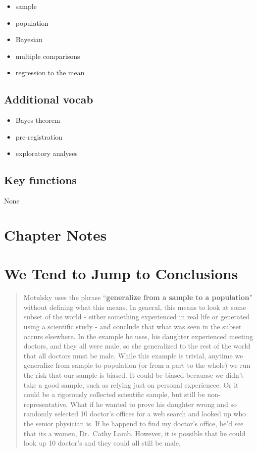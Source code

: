 \documentclass[]{book}
\providecommand{\tightlist}{%
  \setlength{\itemsep}{0pt}\setlength{\parskip}{0pt}}
\theoremstyle{definition}
\theoremstyle{definition}
\theoremstyle{definition}
\theoremstyle{remark}
\begin{document}
\begin{itemize}
\tightlist
\item
  sample
\item
  population
\item
  Bayesian
\item
  multiple comparisons
\item
  regression to the mean
\end{itemize}

\subsection*{Additional vocab}\label{additional-vocab}

\begin{itemize}
\tightlist
\item
  Bayes theorem
\item
  pre-registration
\item
  exploratory analyses
\end{itemize}

\subsection*{Key functions}\label{key-functions}

None

\section*{Chapter Notes}\label{chapter-notes}

\section{We Tend to Jump to
Conclusions}\label{we-tend-to-jump-to-conclusions}

\begin{quote}
Motulsky uses the phrase ``\textbf{generalize from a sample to a
population}'' without defining what this means. In general, this means
to look at some subset of the world - either something experienced in
real life or generated using a scientific study - and conclude that what
was seen in the subset occurs elsewhere. In the example he uses, his
daughter experienced meeting doctors, and they all were male, so she
generalized to the rest of the world that all doctors must be male.
While this example is trivial, anytime we generalize from sample to
population (or from a part to the whole) we run the risk that our sample
is biased. It could be biased becauase we didn't take a good sample,
such as relying just on personal experiencce. Or it could be a
rigorously collected scientific sample, but still be non-representative.
What if he wanted to prove his daughter wrong and so randomly selected
10 doctor's offices for a web search and looked up who the senior
physician is. If he happend to find my doctor's office, he'd see that
its a women, Dr.~Cathy Lamb. However, it is possible that he could look
up 10 doctor's and they could all still be male.
\end{quote}
\end{document}
